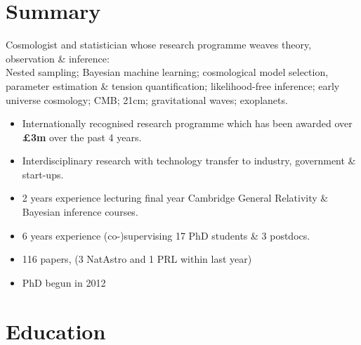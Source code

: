 \documentclass[11pt,a4paper,sans]{moderncv}
\begin{document}
\makecvtitle{}
\section{Summary}
Cosmologist and statistician whose research programme weaves theory, observation \& inference:\\
Nested sampling; Bayesian machine learning; cosmological model selection, parameter estimation \& tension quantification; likelihood-free inference; early universe cosmology; CMB; 21cm; gravitational waves; exoplanets.
    \vspace{0.5ex}
\begin{itemize}
    \item Internationally recognised research programme which has been awarded over \textbf{\pounds3m} over the past 4 years.
    \item Interdisciplinary research with technology transfer to industry, government \& start-ups.
    \item 2 years experience lecturing final year Cambridge General Relativity \& Bayesian inference courses. 
    \item 6 years experience (co-)supervising 17 PhD students \& 3 postdocs.
    \item 116 papers, (3 NatAstro and 1 PRL within last year)
    \item PhD begun in 2012
\end{itemize}

\section{Education}
\end{document}
